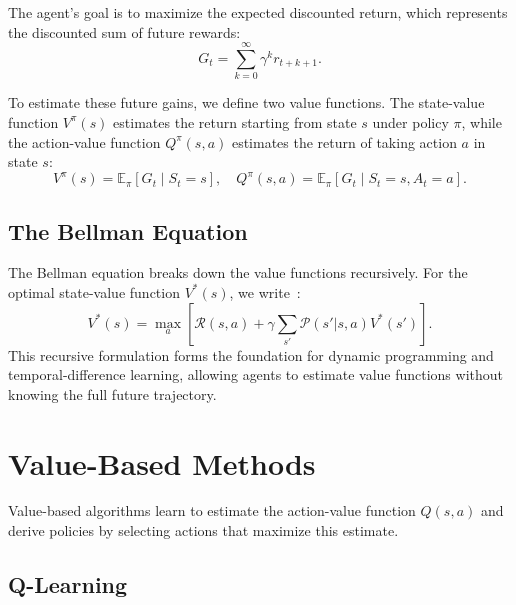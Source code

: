 The agent's goal is to maximize the expected discounted return, which represents the discounted sum of future rewards:
\begin{equation}
    G_t = \sum_{k=0}^{\infty} \gamma^k r_{t+k+1}.
    \label{eq:return}
\end{equation}

To estimate these future gains, we define two value functions. The state-value function $V^\pi(s)$ estimates the return starting from state $s$ under policy $\pi$, while the action-value function $Q^\pi(s,a)$ estimates the return of taking action $a$ in state $s$:
\begin{equation}
    V^\pi(s) = \mathbb{E}_\pi \left[ G_t \mid S_t = s \right], \quad
    Q^\pi(s,a) = \mathbb{E}_\pi \left[ G_t \mid S_t = s, A_t = a \right].
    \label{eq:value_functions}
\end{equation}

\subsection{The Bellman Equation}

The Bellman equation breaks down the value functions recursively. For the optimal state-value function $V^*(s)$, we write~\citep{bellman1957dynamic}:
\begin{equation}
    V^*(s) = \max_{a} \left[ \mathcal{R}(s,a) + \gamma \sum_{s'} \mathcal{P}(s'|s,a) V^*(s') \right].
    \label{eq:bellman}
\end{equation}
This recursive formulation forms the foundation for dynamic programming and temporal-difference learning, allowing agents to estimate value functions without knowing the full future trajectory.

\section{Value-Based Methods}
\label{sec:lit_value_based}

Value-based algorithms learn to estimate the action-value function $Q(s,a)$ and derive policies by selecting actions that maximize this estimate.

\subsection{Q-Learning}

